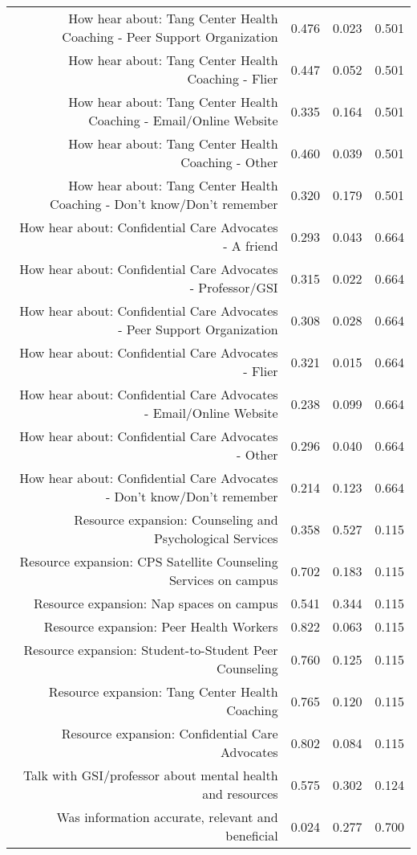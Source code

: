 \documentclass{article}\usepackage[]{graphicx}\usepackage[]{color}
\begin{document}
\begin{table}[ht]
\begin{tabular}{rrrr}
  How hear about: Tang Center Health Coaching - Peer Support Organization & 0.476 & 0.023 & 0.501 \\ 
  How hear about: Tang Center Health Coaching - Flier & 0.447 & 0.052 & 0.501 \\ 
  How hear about: Tang Center Health Coaching - Email/Online Website & 0.335 & 0.164 & 0.501 \\ 
  How hear about: Tang Center Health Coaching - Other & 0.460 & 0.039 & 0.501 \\ 
  How hear about: Tang Center Health Coaching - Don't know/Don't remember & 0.320 & 0.179 & 0.501 \\ 
  How hear about: Confidential Care Advocates - A friend & 0.293 & 0.043 & 0.664 \\ 
  How hear about: Confidential Care Advocates - Professor/GSI & 0.315 & 0.022 & 0.664 \\ 
  How hear about: Confidential Care Advocates - Peer Support Organization & 0.308 & 0.028 & 0.664 \\ 
  How hear about: Confidential Care Advocates - Flier & 0.321 & 0.015 & 0.664 \\ 
  How hear about: Confidential Care Advocates - Email/Online Website & 0.238 & 0.099 & 0.664 \\ 
  How hear about: Confidential Care Advocates - Other & 0.296 & 0.040 & 0.664 \\ 
  How hear about: Confidential Care Advocates - Don't know/Don't remember & 0.214 & 0.123 & 0.664 \\ 
  Resource expansion: Counseling and Psychological Services & 0.358 & 0.527 & 0.115 \\ 
  Resource expansion: CPS Satellite Counseling Services on campus & 0.702 & 0.183 & 0.115 \\ 
  Resource expansion: Nap spaces on campus & 0.541 & 0.344 & 0.115 \\ 
  Resource expansion: Peer Health Workers & 0.822 & 0.063 & 0.115 \\ 
  Resource expansion: Student-to-Student Peer Counseling & 0.760 & 0.125 & 0.115 \\ 
  Resource expansion: Tang Center Health Coaching & 0.765 & 0.120 & 0.115 \\ 
  Resource expansion: Confidential Care Advocates & 0.802 & 0.084 & 0.115 \\ 
  Talk with GSI/professor about mental health and resources & 0.575 & 0.302 & 0.124 \\ 
  Was information accurate, relevant and beneficial & 0.024 & 0.277 & 0.700 \\ 
   \hline
\end{tabular}
\end{table}
\end{document}
